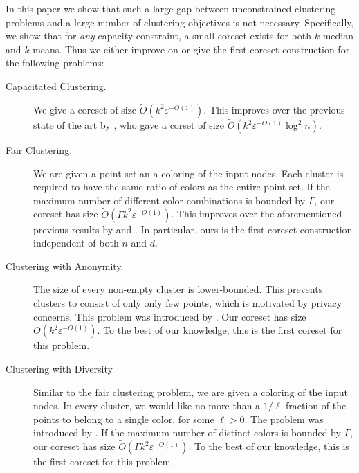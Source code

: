 In this paper we show that such a large gap between unconstrained clustering problems and a large number of clustering objectives is not necessary. Specifically, we show that for \emph{any} capacity constraint, a small coreset exists for both $k$-median and $k$-means. Thus we either improve on or give the first coreset construction for the following problems:
\begin{description}
    \item[Capacitated Clustering.] We give a coreset of size $\tilde{O}(k^2 \varepsilon^{-O(1)})$. This improves over the previous state of the art by \cite{cohen2019fixed}, who gave a corset of size $\tilde{O}(k^2\varepsilon^{-O(1)} \log^2 n )$.
    \item[Fair Clustering.] We are given a point set an a coloring of the input nodes. Each cluster is required to have the same ratio of colors as the entire point set. If the maximum number of different color combinations is bounded by $\Gamma$, our coreset has size $\tilde{O}(\Gamma k^2 \varepsilon^{-O(1)})$. This improves over the aforementioned previous results by \cite{BandyapadhyayFS21} and \cite{HuangJV19}. In particular, ours is the first coreset construction independent of both $n$ and $d$.
    \item[Clustering with Anonymity.] The size of every non-empty cluster is lower-bounded. This prevents clusters to consist of only only few points, which is motivated by privacy concerns. This problem was introduced by \cite{AggarwalPFTKKZ10}. Our coreset has size $\tilde{O}(k^2 \varepsilon^{-O(1)})$. To the best of our knowledge, this is the first coreset for this problem.
    \item[Clustering with Diversity] Similar to the fair clustering problem, we are given a coloring of the input nodes. In every cluster, we would like no more than a $1/\ell$-fraction of the points to belong to a single color, for some $\ell>0$. The problem was introduced by \cite{LiYZ10}. If the maximum number of distinct colors is bounded by $\Gamma$, our coreset has size $\tilde{O}(\Gamma k^2 \varepsilon^{-O(1)})$. To the best of our knowledge, this is the first coreset for this problem.
\end{description}

